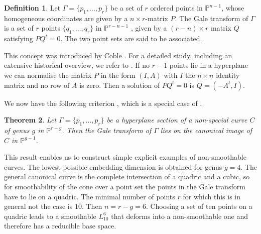 \documentclass{amsart}
\renewcommand{\P}{\mathbb{P}}
\newtheorem{thm}{Theorem}[section]
\theoremstyle{definition}
\newtheorem{defn}[thm]{Definition}
\theoremstyle{remark}
\begin{document}
\begin{defn}
Let $\Gamma=\{p_1,\dots,p_r\}$ be a set of $r$ ordered points in $\P^{n-1}$,
whose homogeneous coordinates are given by a $n\times r$-matrix $P$. 
The Gale transform of $\Gamma$ is a set of $r$ points $\{q_1,\dots,q_r\}$
in $\P^{r-n-1}$ , given by a $(r-n) \times r$ matrix $ Q$ satisfying  $PQ^t=0$.
The two point sets are said to be associated. 
\end{defn}

This concept was introduced by Coble \cite{Co}.
For a detailed study, including an extensive historical overview, we refer to 
 \cite{EP}. If no $r-1$ points lie in a hyperplane we can normalise the matrix $P$ in the form 
 $(I,A)$ with $I$ the $n\times n$ identity matrix and no row of $A$ is zero. Then a solution 
 of  $PQ^t=0$ is $Q=(-A^t,I)$.
 
 We now have the following criterion \cite[Thm. 9]{St}, which is a special
 case of  \cite[Cor. 3.2]{EP}. 

\begin{thm}\label{thm:smooth-gale}
Let $\Gamma=\{p_1,\dots,p_r\}$ be a hyperplane section of a non-special curve
$C$ of genus $g$ in $\P^{r-g}$. Then the Gale transform  of $\Gamma$ lies on the
canonical image of $C$ in $\P^{g-1}$.
\end{thm}



This result enables us to construct simple explicit examples of non-smoothable curves.
The lowest possible embedding dimension is obtained for genus $g=4$.  
The general canonical curve is the complete intersection of a quadric and a cubic,
so for smoothability of the cone over a point set the points in the Gale transform have to lie on a quadric. The minimal number of points $r$
for which this is in general not the case is $10$. Then $n=r - g=6$.
Choosing a set of ten points on a quadric leads to a smoothable $L_{10}^6$ that deforms
into a non-smoothable one and therefore has a reducible base space.
\end{document}

